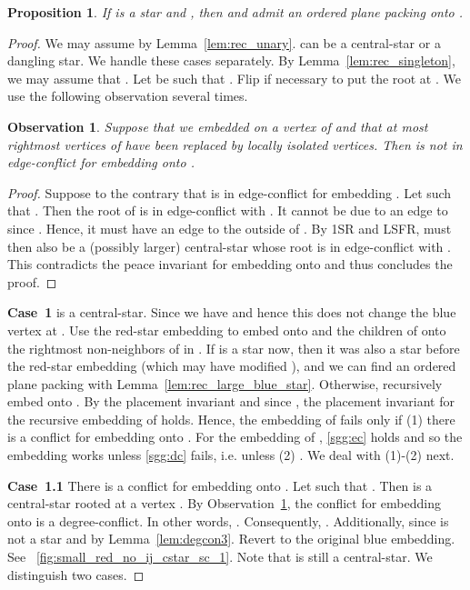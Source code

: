 \documentclass[11pt,a4paper,colorlinks=true,urlcolor=blue,citecolor=red]{article}
\theoremstyle{plain}
\newtheorem{proposition}[theorem]{Proposition}
\newtheorem{observation}[theorem]{Observation}
\newcommand{\case}[1]{\par\vspace{.5\baselineskip}\noindent\textbf{\sffamily Case~#1}}
\begin{document}
\begin{proposition}\label{prop:rec_small_red_star_ij_not_used}
  If  is a star and , then  and 
  admit an ordered plane packing onto .
\end{proposition}
\begin{proof}
  We may assume  by Lemma~\ref{lem:rec_unary}.  can
  be a central-star or a dangling star. We handle these cases
  separately. By Lemma~\ref{lem:rec_singleton}, we may assume that
  . Let  be such that . Flip  if
  necessary to put the root at . We use the following observation
  several times.

  \begin{observation}
    \label{obs:rec_small_red_star_sc}
    Suppose that we embedded  on a vertex of  and that at
    most  rightmost vertices of  have been replaced
    by locally isolated vertices. Then  is not in
    edge-conflict for embedding  onto .
  \end{observation}
  \begin{proof}
    Suppose to the contrary that  is in edge-conflict for
    embedding . Let  such that
    . Then the root of  is in
    edge-conflict with . It cannot be due to an edge to  since
    . Hence, it must have an edge to the
    outside of . By 1SR and LSFR,  must then also be
    a (possibly larger) central-star whose root is in edge-conflict with
    . This contradicts the peace invariant for embedding  onto 
    and thus concludes the proof.
  \end{proof}

  \case{1}  is a central-star. Since  we have
   and hence this does not change the blue
  vertex at . Use the red-star embedding to embed  onto
   and the children of  onto the rightmost 
  non-neighbors of  in . If  is a star now, then
  it was also a star before the red-star embedding (which may
  have modified ), and we can find an ordered plane packing with
  Lemma~\ref{lem:rec_large_blue_star}. Otherwise, recursively embed
   onto . By the placement invariant and since
  , the placement invariant for the recursive
  embedding of  holds. Hence, the embedding of  fails only if
  (1) there is a conflict for embedding  onto . For the
  embedding of , \ref{sgg:ec} holds and so the embedding works unless
  \ref{sgg:dc} fails, i.e. unless (2) .
  We deal with (1)-(2) next.

  \case{1.1} There is a conflict for embedding  onto .  Let
   such that . Then  is a
  central-star rooted at a vertex . By
  Observation~\ref{obs:rec_small_red_star_sc}, the conflict for
  embedding  onto  is a degree-conflict. In other words,
  . Consequently,
  . Additionally, 
  since  is not a star and  by
  Lemma~\ref{lem:degcon3}. Revert to the original blue embedding.  See
  \figurename~\ref{fig:small_red_no_ij_cstar_sc_1}. Note that 
  is still a central-star.  We distinguish two cases.


\end{proof}
\end{document}
